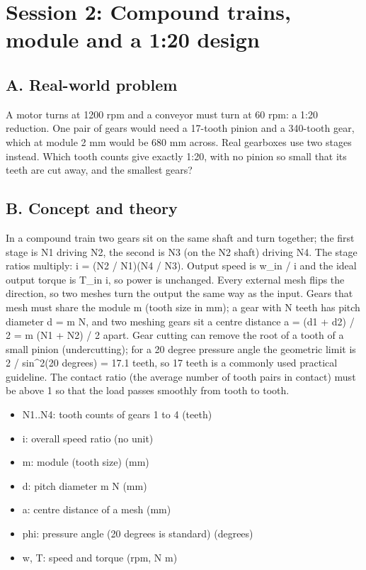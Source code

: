 \documentclass[11pt,a4paper]{article}
\begin{document}
\section{Session 2: Compound trains, module and a 1:20 design}

\subsection*{A. Real-world problem}
A motor turns at 1200 rpm and a conveyor must turn at 60 rpm: a 1:20 reduction. One pair of gears would need a 17-tooth pinion and a 340-tooth gear, which at module 2 mm would be 680 mm across. Real gearboxes use two stages instead. Which tooth counts give exactly 1:20, with no pinion so small that its teeth are cut away, and the smallest gears?

\subsection*{B. Concept and theory}
In a compound train two gears sit on the same shaft and turn together; the first stage is N1 driving N2, the second is N3 (on the N2 shaft) driving N4. The stage ratios multiply: i = (N2 / N1)(N4 / N3). Output speed is w\_in / i and the ideal output torque is T\_in i, so power is unchanged. Every external mesh flips the direction, so two meshes turn the output the same way as the input. Gears that mesh must share the module m (tooth size in mm); a gear with N teeth has pitch diameter d = m N, and two meshing gears sit a centre distance a = (d1 + d2) / 2 = m (N1 + N2) / 2 apart. Gear cutting can remove the root of a tooth of a small pinion (undercutting); for a 20 degree pressure angle the geometric limit is 2 / sin\textasciicircum{}2(20 degrees) = 17.1 teeth, so 17 teeth is a commonly used practical guideline. The contact ratio (the average number of tooth pairs in contact) must be above 1 so that the load passes smoothly from tooth to tooth.

\begin{itemize}[nosep]
\item N1..N4: tooth counts of gears 1 to 4 (teeth)
\item i: overall speed ratio (no unit)
\item m: module (tooth size) (mm)
\item d: pitch diameter m N (mm)
\item a: centre distance of a mesh (mm)
\item phi: pressure angle (20 degrees is standard) (degrees)
\item w, T: speed and torque (rpm, N m)
\end{itemize}
\end{document}
